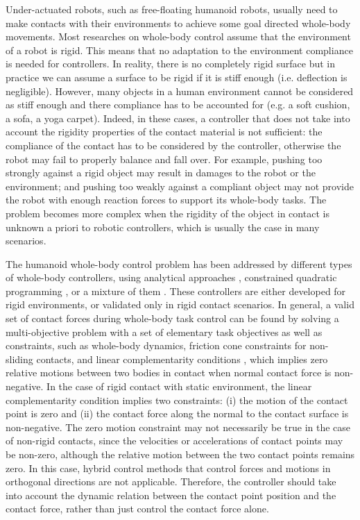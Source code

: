 \documentclass[12pt,a4paper,twoside]{article}
\begin{document}
Under-actuated robots, such as free-floating humanoid robots, usually need to make contacts with their environments to achieve some goal directed whole-body movements. Most researches on whole-body control assume that the environment of a robot is rigid. This means that no adaptation to the environment compliance is needed for controllers. In reality, there is no completely rigid surface but in practice we can assume a surface to be rigid if it is stiff enough (i.e. deflection is negligible). However, many objects in a human environment cannot be considered as stiff enough and there compliance has to be accounted for (e.g. a soft cushion, a sofa, a yoga carpet). Indeed, in these cases, a controller that does not take into account the rigidity properties of the contact material is not sufficient:  the compliance of
the contact has to be considered by the controller, otherwise the robot may fail to properly balance and fall over. For example, pushing too strongly against a rigid object may result in damages to the robot or the environment; and pushing too weakly against a compliant object may not provide the robot with enough reaction forces to support its whole-body tasks. The problem becomes more complex when the rigidity of the object in contact is unknown a priori to robotic controllers, which is usually the case in many scenarios.
 

The humanoid whole-body control problem has been addressed by different types of whole-body controllers, using analytical approaches \cite{Khatib08,Sentis10,Righetti13}, constrained quadratic programming \cite{Abe07,Liu11,Salini13,Saab13}, or a mixture of them \cite{Stephens10,Nori15}. These controllers are either developed for rigid environments, or validated only in rigid contact scenarios.
In general, a valid set of contact forces during whole-body task control can be found by solving a multi-objective problem with a set of elementary task objectives as well as constraints, such as whole-body dynamics, friction cone constraints for non-sliding contacts, and linear complementarity conditions \cite{Muico09,Saab13,Salini13}, which implies zero relative motions between two bodies in contact when normal contact force is non-negative. In the case of rigid contact with static environment, the linear complementarity condition implies two constraints: (i) the motion of the contact point is zero and (ii) the contact force along the normal to the contact surface is non-negative.  The zero motion constraint may not necessarily be true in the case of non-rigid contacts, since the velocities or accelerations of contact points may be non-zero, although the relative motion between the two contact points remains zero. In this case, hybrid control methods \cite{khatib87} that control forces and motions in orthogonal directions are not applicable. Therefore, the controller should take into account the dynamic relation between the contact point position and the contact force, rather than just control the contact force alone. 
\end{document}
